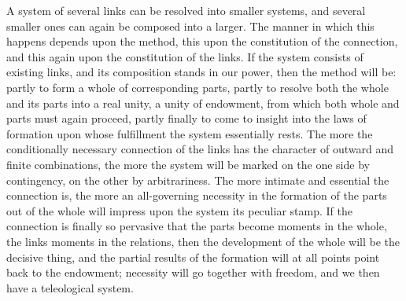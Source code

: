 \documentclass[12pt]{book}
\begin{document}
A system of several links can be resolved into smaller systems, and several
smaller ones can again be composed into a larger. The manner in which this
happens depends upon the method, this upon the constitution of the connection,
and this again upon the constitution of the links. If the system consists of
existing links, and its composition stands in our power, then the method will
be: partly to form a whole of corresponding parts, partly to resolve both the
whole and its parts into a real unity, a unity of endowment, from which both
whole and parts must again proceed, partly finally to come to insight into the
laws of formation upon whose fulfillment the system essentially rests. The more
the conditionally necessary connection of the links has the character of
outward and finite combinations, the more the system will be marked on the one
side by contingency, on the other by arbitrariness. The more intimate and
essential the connection is, the more an all-governing necessity in the
formation of the parts out of the whole will impress upon the system its
peculiar stamp. If the connection is finally so pervasive that the parts become
moments in the whole, the links moments in the relations, then the development
of the whole will be the decisive thing, and the partial results of the
formation will at all points point back to the endowment; necessity will go
together with freedom, and we then have a teleological system.
\end{document}
